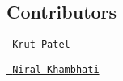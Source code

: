 \subsection*{Contributors}


\begin{DoxyItemize}
\item \href{f20170184@hyderabad.bits-pilani.ac.in}\texttt{ Krut Patel}
\item \href{f20170130@hyderabad.bits-pilani.ac.in}\texttt{ Niral Khambhati} 
\end{DoxyItemize}